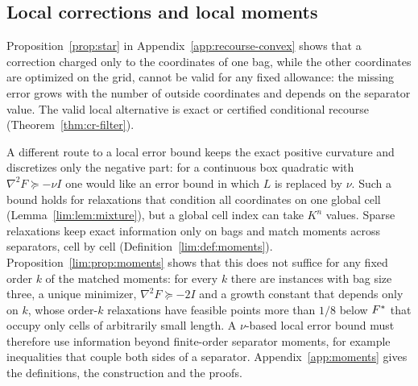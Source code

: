\subsection{Local corrections and local moments}\label{sec:limits-local}

Proposition~\ref{prop:star} in Appendix~\ref{app:recourse-convex} shows that
a correction charged only to the coordinates of one bag, while the other
coordinates are optimized on the grid, cannot be valid for any fixed
allowance: the missing error grows with the number of outside coordinates and
depends on the separator value. The valid local alternative is exact or
certified conditional recourse (Theorem~\ref{thm:cr-filter}).

A different route to a local error bound keeps the exact positive curvature
and discretizes only the negative part: for a continuous box quadratic with
$\nabla^2F\succeq-\nu I$ one would like an error bound in which $L$ is
replaced by $\nu$. Such a bound holds for relaxations that condition all
coordinates on one global cell (Lemma~\ref{lim:lem:mixture}), but a global
cell index can take $K^n$ values. Sparse relaxations keep exact information
only on bags and match moments across separators, cell by cell
(Definition~\ref{lim:def:moments}). Proposition~\ref{lim:prop:moments} shows
that this does not suffice for any fixed order $k$ of the matched moments: for
every $k$ there are instances with bag size three, a unique minimizer,
$\nabla^2F\succeq-2I$ and a growth constant that depends only on $k$, whose
order-$k$ relaxations have feasible points more than $1/8$ below $F^{*}$ that
occupy only cells of arbitrarily small length. A $\nu$-based local error
bound must therefore use information beyond finite-order separator moments,
for example inequalities that couple both sides of a separator.
Appendix~\ref{app:moments} gives the definitions, the construction and the
proofs.
